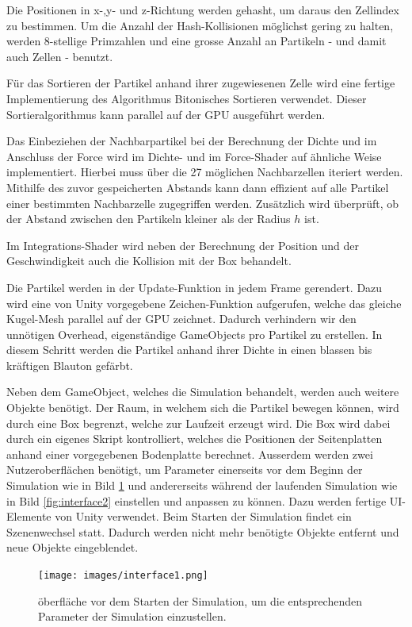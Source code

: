 \documentclass[a4paper]{paper}
\begin{document}
Die Positionen in x-,y- und z-Richtung werden gehasht, um daraus den Zellindex zu bestimmen. Um die Anzahl der Hash-Kollisionen möglichst gering zu halten, werden 8-stellige Primzahlen und eine grosse Anzahl an Partikeln - und damit auch Zellen - benutzt.

Für das Sortieren der Partikel anhand ihrer zugewiesenen Zelle wird eine fertige Implementierung des Algorithmus Bitonisches Sortieren verwendet. Dieser Sortieralgorithmus kann parallel auf der GPU ausgeführt werden.

Das Einbeziehen der Nachbarpartikel bei der Berechnung der Dichte und im Anschluss der Force wird im Dichte- und im Force-Shader auf ähnliche Weise implementiert. Hierbei muss über die 27 möglichen Nachbarzellen iteriert werden. Mithilfe des zuvor gespeicherten Abstands kann dann effizient auf alle Partikel einer bestimmten Nachbarzelle zugegriffen werden. Zusätzlich wird überprüft, ob der Abstand zwischen den Partikeln kleiner als der Radius $h$ ist.

Im Integrations-Shader wird neben der Berechnung der Position und der Geschwindigkeit auch die Kollision mit der Box behandelt.

Die Partikel werden in der Update-Funktion in jedem Frame gerendert. Dazu wird eine von Unity vorgegebene Zeichen-Funktion aufgerufen, welche das gleiche Kugel-Mesh parallel auf der GPU zeichnet. Dadurch verhindern wir den unnötigen Overhead, eigenständige GameObjects pro Partikel zu erstellen. In diesem Schritt werden die Partikel anhand ihrer Dichte in einen blassen bis kräftigen Blauton gefärbt.

Neben dem GameObject, welches die Simulation behandelt, werden auch weitere Objekte benötigt. Der Raum, in welchem sich die Partikel bewegen können, wird durch eine Box begrenzt, welche zur Laufzeit erzeugt wird. Die Box wird dabei durch ein eigenes Skript kontrolliert, welches die Positionen der Seitenplatten anhand einer vorgegebenen Bodenplatte berechnet.
Ausserdem werden zwei Nutzeroberflächen benötigt, um Parameter einerseits vor dem Beginn der Simulation wie in Bild \ref{fig:interface1} und andererseits während der laufenden Simulation wie in Bild \ref{fig:interface2} einstellen und anpassen zu können. Dazu werden fertige UI-Elemente von Unity verwendet. Beim Starten der Simulation findet ein Szenenwechsel statt. Dadurch werden nicht mehr benötigte Objekte entfernt und neue Objekte eingeblendet.

\begin{figure}[t]
    \centering
    \texttt{[image: images/interface1.png]}
    \caption{öberfläche vor dem Starten der Simulation, um die entsprechenden Parameter der Simulation einzustellen.}
    \label{fig:interface1}
\end{figure}
\end{document}
